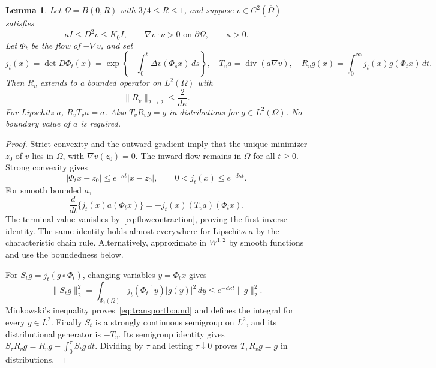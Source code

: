 \documentclass[11pt]{article}
\newtheorem{lemma}[theorem]{Lemma}
\theoremstyle{remark}
\newcommand{\diver}{\operatorname{div}}
\newcommand{\norm}[1]{\lVert #1\rVert}
\newcommand{\abs}[1]{\lvert #1\rvert}
\begin{document}
\begin{lemma}\label{lem:transport}
Let $\Omega=B(0,R)$ with $3/4\le R\le1$, and suppose $v\in C^2(\overline\Omega)$ satisfies
\begin{equation}\label{eq:flowgeometry}
 \kappa I\le D^2v\le K_0I,\qquad \nabla v\cdot\nu>0\text{ on }\partial\Omega,
 \qquad \kappa>0.
\end{equation}
Let $\Phi_t$ be the flow of $-\nabla v$, and set
\[
 j_t(x)=\det D\Phi_t(x)
 =\exp\left\{-\int_0^t\Delta v(\Phi_sx)\,ds\right\},
 \quad T_va=\diver(a\nabla v),
 \quad R_vg(x)=\int_0^\infty j_t(x)g(\Phi_tx)\,dt.
\]
Then $R_v$ extends to a bounded operator on $L^2(\Omega)$ with
\begin{equation}\label{eq:transportbound}
 \norm{R_v}_{2\to2}\le\frac{2}{d\kappa}.
\end{equation}
For Lipschitz $a$, $R_vT_va=a$. Also $T_vR_vg=g$ in distributions for $g\in L^2(\Omega)$. No boundary value of $a$ is required.
\end{lemma}
\begin{proof}
Strict convexity and the outward gradient imply that the unique minimizer $z_0$ of $v$ lies in $\Omega$, with $\nabla v(z_0)=0$. The inward flow remains in $\Omega$ for all $t\ge0$. Strong convexity gives 
\begin{equation}\label{eq:flowcontraction}
 \abs{\Phi_tx-z_0}\le e^{-\kappa t}\abs{x-z_0},
 \qquad 0<j_t(x)\le e^{-d\kappa t}.
\end{equation}
For smooth bounded $a$,
\[
 \frac{d}{dt}\{j_t(x)a(\Phi_tx)\}=-j_t(x)(T_va)(\Phi_tx).
\]
The terminal value vanishes by~\eqref{eq:flowcontraction}, proving the first inverse identity.  The same identity holds almost everywhere for Lipschitz $a$ by the characteristic chain rule. Alternatively, approximate in $W^{1,2}$ by smooth functions and use the boundedness below.

For $S_tg=j_t(g\circ\Phi_t)$, changing variables $y=\Phi_tx$ gives
\[
 \norm{S_tg}_2^2
 =\int_{\Phi_t(\Omega)}j_t(\Phi_t^{-1}y)\abs{g(y)}^2\,dy
 \le e^{-d\kappa t}\norm g_2^2.
\]
Minkowski's inequality proves~\eqref{eq:transportbound} and defines the integral for every $g\in L^2$. Finally $S_t$ is a strongly continuous semigroup on $L^2$, and its distributional generator is $-T_v$.   Its semigroup identity gives
$S_\tau R_vg=R_vg-\int_0^\tau S_tg\,dt$.
Dividing by $\tau$ and letting $\tau\downarrow0$ proves $T_vR_vg=g$ in distributions.
\end{proof}
\end{document}
